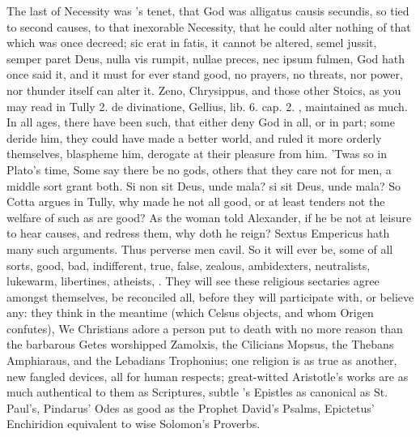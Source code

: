 {The last of Necessity was \Seneca's tenet, that God was alligatus causis
secundis, so tied to second causes, to that inexorable Necessity, that
he could alter nothing of that which was once decreed; sic erat in
fatis, it cannot be altered, semel jussit, semper paret Deus, nulla vis
rumpit, nullae preces, nec ipsum fulmen, God hath once said it, and it
must for ever stand good, no prayers, no threats, nor power, nor
thunder itself can alter it. Zeno, Chrysippus, and those other Stoics,
as you may read in Tully 2. de divinatione, Gellius, lib. 6. cap. 2.
\etc{}, maintained as much. In all ages, there have been such, that either
deny God in all, or in part; some deride him, they could have made a
better world, and ruled it more orderly themselves, blaspheme him,
derogate at their pleasure from him. 'Twas so in Plato's time,
Some say there be no gods, others that they care not for men, a middle
sort grant both. Si non sit Deus, unde mala? si sit Deus, unde mala? So
Cotta argues in Tully, why made he not all good, or at least tenders
not the welfare of such as are good? As the woman told Alexander, if he
be not at leisure to hear causes, and redress them, why doth he reign?
Sextus Empericus hath many such arguments. Thus perverse men
cavil. So it will ever be, some of all sorts, good, bad, indifferent,
true, false, zealous, ambidexters, neutralists, lukewarm, libertines,
atheists, \etc{}. They will see these religious sectaries agree amongst
themselves, be reconciled all, before they will participate with, or
believe any: they think in the meantime (which Celsus objects,
and whom Origen confutes), We Christians adore a person put to
death with no more reason than the barbarous Getes worshipped
Zamolxis, the Cilicians Mopsus, the Thebans Amphiaraus, and the
Lebadians Trophonius; one religion is as true as another, new fangled
devices, all for human respects; great-witted Aristotle's works are as
much authentical to them as Scriptures, subtle \Seneca's Epistles as
canonical as St. Paul's, Pindarus' Odes as good as the Prophet David's
Psalms, Epictetus' Enchiridion equivalent to wise Solomon's Proverbs.

}
